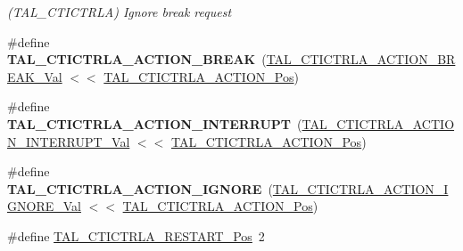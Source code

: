 \begin{DoxyCompactItemize}
\begin{DoxyCompactList}\small\item\em (T\+A\+L\+\_\+\+C\+T\+I\+C\+T\+R\+L\+A) Ignore break request \end{DoxyCompactList}\item 
\hypertarget{group___s_a_m_l21___t_a_l_ga723d8e5ba4cd280f0ef5ea195b5626c6}{}\#define {\bfseries T\+A\+L\+\_\+\+C\+T\+I\+C\+T\+R\+L\+A\+\_\+\+A\+C\+T\+I\+O\+N\+\_\+\+B\+R\+E\+A\+K}~(\hyperlink{group___s_a_m_l21___t_a_l_ga7219b74e5ee3d7f3dcda06fb364bb5e8}{T\+A\+L\+\_\+\+C\+T\+I\+C\+T\+R\+L\+A\+\_\+\+A\+C\+T\+I\+O\+N\+\_\+\+B\+R\+E\+A\+K\+\_\+\+Val} $<$$<$ \hyperlink{group___s_a_m_l21___t_a_l_ga8854a5053c397d6160d4dbb6219a8f59}{T\+A\+L\+\_\+\+C\+T\+I\+C\+T\+R\+L\+A\+\_\+\+A\+C\+T\+I\+O\+N\+\_\+\+Pos})\label{group___s_a_m_l21___t_a_l_ga723d8e5ba4cd280f0ef5ea195b5626c6}

\item 
\hypertarget{group___s_a_m_l21___t_a_l_ga138a2a419c504eedf0627290cf503b8f}{}\#define {\bfseries T\+A\+L\+\_\+\+C\+T\+I\+C\+T\+R\+L\+A\+\_\+\+A\+C\+T\+I\+O\+N\+\_\+\+I\+N\+T\+E\+R\+R\+U\+P\+T}~(\hyperlink{group___s_a_m_l21___t_a_l_ga51c9f20bc157ce62adcee95962516058}{T\+A\+L\+\_\+\+C\+T\+I\+C\+T\+R\+L\+A\+\_\+\+A\+C\+T\+I\+O\+N\+\_\+\+I\+N\+T\+E\+R\+R\+U\+P\+T\+\_\+\+Val} $<$$<$ \hyperlink{group___s_a_m_l21___t_a_l_ga8854a5053c397d6160d4dbb6219a8f59}{T\+A\+L\+\_\+\+C\+T\+I\+C\+T\+R\+L\+A\+\_\+\+A\+C\+T\+I\+O\+N\+\_\+\+Pos})\label{group___s_a_m_l21___t_a_l_ga138a2a419c504eedf0627290cf503b8f}

\item 
\hypertarget{group___s_a_m_l21___t_a_l_gab63967cc4d91d760ac4399375c3ecf4f}{}\#define {\bfseries T\+A\+L\+\_\+\+C\+T\+I\+C\+T\+R\+L\+A\+\_\+\+A\+C\+T\+I\+O\+N\+\_\+\+I\+G\+N\+O\+R\+E}~(\hyperlink{group___s_a_m_l21___t_a_l_gaa45d117ebf5e2bef6af44ff3c62e780f}{T\+A\+L\+\_\+\+C\+T\+I\+C\+T\+R\+L\+A\+\_\+\+A\+C\+T\+I\+O\+N\+\_\+\+I\+G\+N\+O\+R\+E\+\_\+\+Val} $<$$<$ \hyperlink{group___s_a_m_l21___t_a_l_ga8854a5053c397d6160d4dbb6219a8f59}{T\+A\+L\+\_\+\+C\+T\+I\+C\+T\+R\+L\+A\+\_\+\+A\+C\+T\+I\+O\+N\+\_\+\+Pos})\label{group___s_a_m_l21___t_a_l_gab63967cc4d91d760ac4399375c3ecf4f}

\item 
\hypertarget{group___s_a_m_l21___t_a_l_ga23303a59533757d0e2b8af029be2173e}{}\#define \hyperlink{group___s_a_m_l21___t_a_l_ga23303a59533757d0e2b8af029be2173e}{T\+A\+L\+\_\+\+C\+T\+I\+C\+T\+R\+L\+A\+\_\+\+R\+E\+S\+T\+A\+R\+T\+\_\+\+Pos}~2\label{group___s_a_m_l21___t_a_l_ga23303a59533757d0e2b8af029be2173e}


\end{DoxyCompactItemize}
